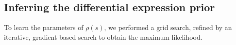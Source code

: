 % 
% 

\subsection*{Inferring the differential expression prior}\label{sec:EM}
To learn the parameters of $\rho(s)$, we performed a grid search, refined by an iterative, gradient-based search to obtain the maximum likelihood.

